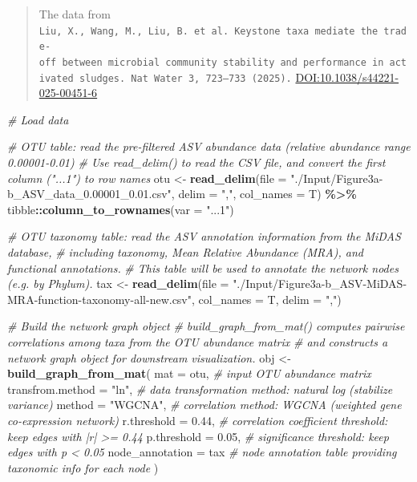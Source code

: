 \documentclass[
]{book}
\newenvironment{Shaded}{\begin{snugshade}}{\end{snugshade}}
\newcommand{\AttributeTok}[1]{\textcolor[rgb]{0.13,0.29,0.53}{#1}}
\newcommand{\CommentTok}[1]{\textcolor[rgb]{0.56,0.35,0.01}{\textit{#1}}}
\newcommand{\FloatTok}[1]{\textcolor[rgb]{0.00,0.00,0.81}{#1}}
\newcommand{\FunctionTok}[1]{\textcolor[rgb]{0.13,0.29,0.53}{\textbf{#1}}}
\newcommand{\NormalTok}[1]{#1}
\newcommand{\OtherTok}[1]{\textcolor[rgb]{0.56,0.35,0.01}{#1}}
\newcommand{\SpecialCharTok}[1]{\textcolor[rgb]{0.81,0.36,0.00}{\textbf{#1}}}
\newcommand{\StringTok}[1]{\textcolor[rgb]{0.31,0.60,0.02}{#1}}
\begin{document}
\begin{quote}
The data from \texttt{Liu,\ X.,\ Wang,\ M.,\ Liu,\ B.\ et\ al.\ Keystone\ taxa\ mediate\ the\ trade-off\ between\ microbial\ community\ stability\ and\ performance\ in\ activated\ sludges.\ Nat\ Water\ 3,\ 723–733\ (2025).} \href{https://doi.org/10.1038/s44221-025-00451-6}{DOI:10.1038/s44221-025-00451-6}
\end{quote}

\begin{Shaded}
\begin{Highlighting}[]
\CommentTok{\# Load data}

\CommentTok{\# OTU table: read the pre{-}filtered ASV abundance data (relative abundance range 0.00001{-}0.01)}
\CommentTok{\# Use read\_delim() to read the CSV file, and convert the first column ("...1") to row names}
\NormalTok{otu }\OtherTok{\textless{}{-}} \FunctionTok{read\_delim}\NormalTok{(}\AttributeTok{file =} \StringTok{"./Input/Figure3a{-}b\_ASV\_data\_0.00001\_0.01.csv"}\NormalTok{, }\AttributeTok{delim =} \StringTok{","}\NormalTok{, }\AttributeTok{col\_names =}\NormalTok{ T) }\SpecialCharTok{\%\textgreater{}\%}
\NormalTok{  tibble}\SpecialCharTok{::}\FunctionTok{column\_to\_rownames}\NormalTok{(}\AttributeTok{var =} \StringTok{"...1"}\NormalTok{)}

\CommentTok{\# OTU taxonomy table: read the ASV annotation information from the MiDAS database,}
\CommentTok{\# including taxonomy, Mean Relative Abundance (MRA), and functional annotations.}
\CommentTok{\# This table will be used to annotate the network nodes (e.g. by Phylum).}
\NormalTok{tax }\OtherTok{\textless{}{-}} \FunctionTok{read\_delim}\NormalTok{(}\AttributeTok{file =} \StringTok{"./Input/Figure3a{-}b\_ASV{-}MiDAS{-}MRA{-}function{-}taxonomy{-}all{-}new.csv"}\NormalTok{, }\AttributeTok{col\_names =}\NormalTok{ T, }\AttributeTok{delim =} \StringTok{","}\NormalTok{)}

\CommentTok{\# Build the network graph object}
\CommentTok{\# build\_graph\_from\_mat() computes pairwise correlations among taxa from the OTU abundance matrix}
\CommentTok{\# and constructs a network graph object for downstream visualization.}
\NormalTok{obj }\OtherTok{\textless{}{-}} \FunctionTok{build\_graph\_from\_mat}\NormalTok{(}
  \AttributeTok{mat              =}\NormalTok{ otu,        }\CommentTok{\# input OTU abundance matrix}
  \AttributeTok{transfrom.method =} \StringTok{"ln"}\NormalTok{,       }\CommentTok{\# data transformation method: natural log (stabilize variance)}
  \AttributeTok{method           =} \StringTok{"WGCNA"}\NormalTok{,    }\CommentTok{\# correlation method: WGCNA (weighted gene co{-}expression network)}
  \AttributeTok{r.threshold      =} \FloatTok{0.44}\NormalTok{,       }\CommentTok{\# correlation coefficient threshold: keep edges with |r| \textgreater{}= 0.44}
  \AttributeTok{p.threshold      =} \FloatTok{0.05}\NormalTok{,       }\CommentTok{\# significance threshold: keep edges with p \textless{} 0.05}
  \AttributeTok{node\_annotation  =}\NormalTok{ tax         }\CommentTok{\# node annotation table providing taxonomic info for each node}
\NormalTok{)}



\end{Highlighting}
\end{Shaded}
\end{document}

